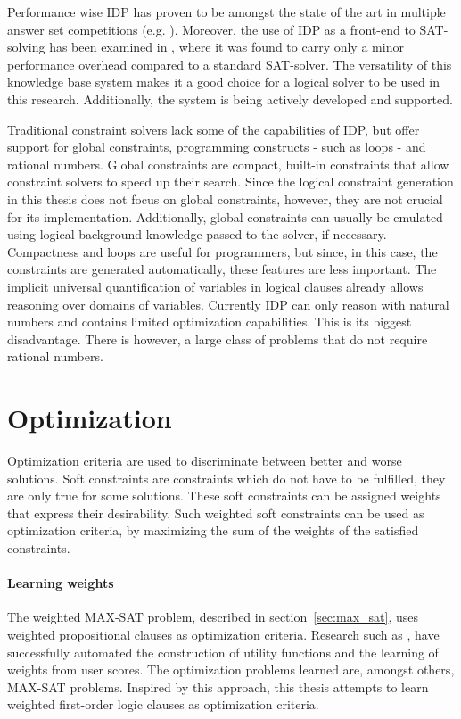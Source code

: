 Performance wise IDP has proven to be amongst the state of the art in multiple answer set competitions (e.g. \cite{calimeri2014third}).
Moreover, the use of IDP as a front-end to SAT-solving has been examined in \cite{bruynooghe2014predicate}, where it was found to carry only a minor performance overhead compared to a standard SAT-solver.
The versatility of this knowledge base system makes it a good choice for a logical solver to be used in this research.
Additionally, the system is being actively developed and supported.

Traditional constraint solvers lack some of the capabilities of IDP, but offer support for global constraints, programming constructs - such as loops - and rational numbers.
Global constraints are compact, built-in constraints that allow constraint solvers to speed up their search.
Since the logical constraint generation in this thesis does not focus on global constraints, however, they are not crucial for its implementation.
Additionally, global constraints can usually be emulated using logical background knowledge passed to the solver, if necessary.
Compactness and loops are useful for programmers, but since, in this case, the constraints are generated automatically, these features are less important.
The implicit universal quantification of variables in logical clauses already allows reasoning over domains of variables.
Currently IDP can only reason with natural numbers and contains limited optimization capabilities.
This is its biggest disadvantage.
There is however, a large class of problems that do not require rational numbers.

\section{Optimization}
Optimization criteria are used to discriminate between better and worse solutions.
Soft constraints are constraints which do not have to be fulfilled, they are only true for some solutions.
These soft constraints can be assigned weights that express their desirability.
Such weighted soft constraints can be used as optimization criteria, by maximizing the sum of the weights of the satisfied constraints.

\paragraph{Learning weights}
The weighted MAX-SAT problem, described in section~\ref{sec:max_sat}, uses weighted propositional clauses as optimization criteria.
Research such as \cite{campigotto2011active}, have successfully automated the construction of utility functions and the learning of weights from user scores.
The optimization problems learned are, amongst others, MAX-SAT problems.
Inspired by this approach, this thesis attempts to learn weighted first-order logic clauses as optimization criteria.

